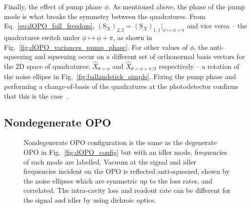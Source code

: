 Finally, the effect of pump phase $\phi$. As mentioned above, the phase of the pump mode is what breaks the symmetry between the quadratures. From Eq.~\ref{eq:dOPO_full_freedom}, $(\text{S}_X)_{2,2}=(\text{S}_X)_{1,1}|_{\phi\mapsto\phi+\pi}$ and vice versa -- the quadratures switch under $\phi\mapsto\phi+\pi$, as shown in Fig.~\ref{fig:dOPO_variances_pump_phase}. For other values of $\phi$, the anti-squeezing and squeezing occur on a different set of orthonormal basis vectors for the 2D space of quadratures: $\hat{X}_{\theta=\phi}$ and $\hat{X}_{\theta=\phi+\pi/2}$ respectively  -- a rotation of the noise ellipse in Fig.~\ref{fig:ballandstick_simple}. 
Fixing the pump phase and performing a change-of-basis of the quadratures at the photodetector confirms that this is the case~\cite{}.




\subsection{Nondegenerate OPO}
\label{sec:nOPO}

\begin{figure}
	\centering
	\caption{Nondegenerate OPO configuration is the same as the degenerate OPO in Fig.~\ref{fig:dOPO_config} but with an idler mode, frequencies of each mode are labelled. Vacuum at the signal and idler frequencies incident on the OPO is reflected anti-squeezed, shown by the noise ellipses which are symmetric up to the loss rates, and correlated. The intra-cavity loss and readout rate can be different for the signal and idler by using dichroic optics.}
	\label{fig:nOPO_config}
\end{figure}

